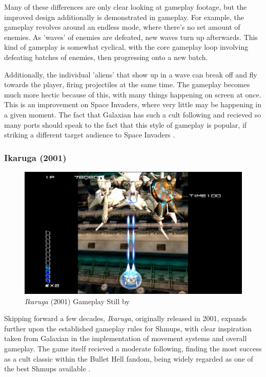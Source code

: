 \documentclass{scrartcl}
\let\cite\textcite
\let\citep\autocite
\begin{document}
Many of these differences are only clear looking at gameplay footage, but the improved design additionally is demonstrated in gameplay. For example, the gameplay revolves around an endless mode, where there's no set amount of enemies. As 'waves' of enemies are defeated, new waves turn up afterwards. This kind of gameplay is somewhat cyclical, with the core gameplay loop involving defeating batches of enemies, then progressing onto a new batch.

Additionally, the individual 'aliens' that show up in a wave can break off and fly towards the player, firing projectiles at the same time. The gameplay becomes much more hectic because of this, with many things happening on screen at once. This is an improvement on Space Invaders, where very little may be happening in a given moment. The fact that Galaxian has such a cult following and recieved so many ports should speak to the fact that this style of gameplay is popular, if striking a different target audience to Space Invaders \citep{GiantBomb001}.

\subsubsection{Ikaruga (2001)}

\begin{figure}[ht]
  \centering
  \includegraphics[width=.7\columnwidth]{Ikaruga.png}
  \caption[\textit{Ikaruga}]{\textit{Ikaruga} (2001) Gameplay Still by \cite{Youtube003}}
\end{figure}

Skipping forward a few decades, \textit{Ikaruga}, originally released in 2001, expands further upon the established gameplay rules for Shmups, with clear inspiration taken from Galaxian in the implementation of movement systems and overall gameplay. The game itself recieved a moderate following, finding the most success as a cult classic within the Bullet Hell fandom, being widely regarded as one of the best Shmups available \citep{GiantBomb002}.
\end{document}
